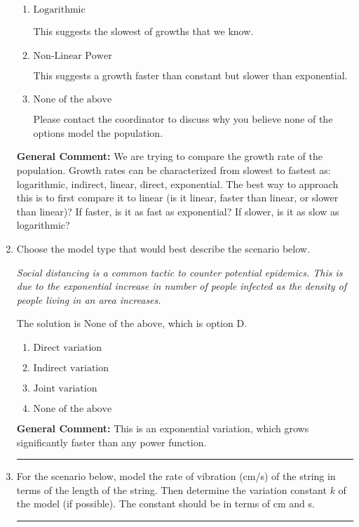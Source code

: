 \documentclass{extbook}[14pt]
\newcommand{\litem}[1]{\item #1

\rule{\textwidth}{0.4pt}}
\begin{document}
\begin{enumerate}
{\begin{enumerate}[label=\Alph*.]
This suggests the fastest of growths that we know.
\item \( \text{Logarithmic} \)

This suggests the slowest of growths that we know.
\item \( \text{Non-Linear Power} \)

This suggests a growth faster than constant but slower than exponential.
\item \( \text{None of the above} \)

Please contact the coordinator to discuss why you believe none of the options model the population.
\end{enumerate}

\textbf{General Comment:} We are trying to compare the growth rate of the population. Growth rates can be characterized from slowest to fastest as: logarithmic, indirect, linear, direct, exponential. The best way to approach this is to first compare it to linear (is it linear, faster than linear, or slower than linear)? If faster, is it as fast as exponential? If slower, is it as slow as logarithmic?
}
\litem{
Choose the model type that would best describe the scenario below.

\begin{center}
    \textit{ Social distancing is a common tactic to counter potential epidemics. This is due to the exponential increase in number of people infected as the density of people living in an area increases. }
\end{center}


The solution is \( \text{None of the above} \), which is option D.\begin{enumerate}[label=\Alph*.]
\item \( \text{Direct variation} \)


\item \( \text{Indirect variation} \)


\item \( \text{Joint variation} \)


\item \( \text{None of the above} \)


\end{enumerate}

\textbf{General Comment:} This is an exponential variation, which grows significantly faster than any power function.
}
\litem{
For the scenario below, model the rate of vibration (cm/s) of the string in terms of the length of the string. Then determine the variation constant $k$ of the model (if possible). The constant should be in terms of cm and s.

}
\end{enumerate}
\end{document}
